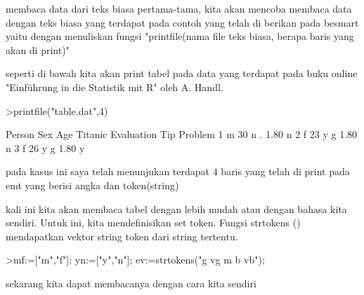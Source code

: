 \documentclass[a4paper,10pt]{article}
\begin{document}
\begin{eulernotebook}
\begin{eulercomment}
\begin{eulercomment}
\begin{eulercomment}
\begin{eulercomment}
\begin{eulercomment}
\begin{eulercomment}
\begin{eulercomment}
\begin{eulercomment}
\begin{eulercomment}
membaca data dari teks biasa pertama-tama, kita akan mencoba membaca
data dengan teks biasa yang terdapat pada contoh yang telah di berikan
pada besmart yaitu dengan menuliskan fungsi "printfile(nama file teks
biasa, berapa baris yang akan di print)"

seperti di bawah kita akan print tabel pada data yang terdapat pada
buku online "Einführung in die Statistik mit R" oleh A. Handl.
\end{eulercomment}
\begin{eulerprompt}
>printfile("table.dat",4)
\end{eulerprompt}
\begin{euleroutput}
  Person Sex Age Titanic Evaluation Tip Problem
  1 m 30 n . 1.80 n
  2 f 23 y g 1.80 n
  3 f 26 y g 1.80 y
\end{euleroutput}
\begin{eulercomment}
pada kasus ini saya telah menunjukan terdapat 4 baris yang telah di
print pada emt yang berisi angka dan token(string)

kali ini kita akan membaca tabel dengan lebih mudah atau dengan bahasa
kita sendiri. Untuk ini, kita mendefinisikan set token. Fungsi
strtokens () mendapatkan vektor string token dari string tertentu.
\end{eulercomment}
\begin{eulerprompt}
>mf:=["m","f"]; yn:=["y","n"]; ev:=strtokens("g vg m b vb");
\end{eulerprompt}
\begin{eulercomment}
sekarang kita dapat membacanya dengan cara kita sendiri


\end{eulercomment}
\end{eulercomment}
\end{eulercomment}
\end{eulercomment}
\end{eulercomment}
\end{eulercomment}
\end{eulercomment}
\end{eulercomment}
\end{eulercomment}
\end{eulernotebook}
\end{document}
